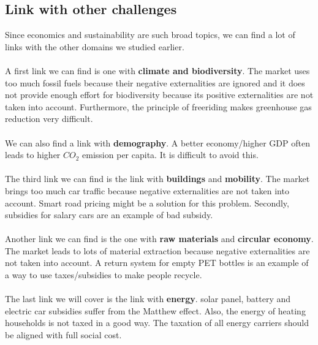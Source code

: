 \documentclass[../summary.tex]{subfiles}
\begin{document}
	\subsection{Link with other challenges}
	Since economics and sustainability are such broad topics, we can find a lot of links with the other domains we studied earlier. 
	\\\\
	A first link we can find is one with \textbf{climate and biodiversity}. The market uses too much fossil fuels because their negative externalities are ignored and it does not provide enough effort for biodiversity because its positive externalities are not taken into account. Furthermore, the principle of freeriding makes greenhouse gas reduction very difficult. 
	\\\\
	We can also find a link with \textbf{demography}. A better economy/higher GDP often leads to higher $CO_2$ emission per capita. It is difficult to avoid this. 
	\\\\
	The third link we can find is the link with \textbf{buildings} and \textbf{mobility}. The market brings too much car traffic because negative externalities are not taken into account. Smart road pricing might be a solution for this problem. Secondly, subsidies for salary cars are an example of bad subsidy. 
	\\\\
	Another link we can find is the one with \textbf{raw materials} and \textbf{circular economy}. The market leads to lots of material extraction because negative externalities are not taken into account. A return system for empty PET bottles is an example of a way to use taxes/subsidies to make people recycle.
	\\\\
	The last link we will cover is the link with \textbf{energy}. solar panel, battery and electric car subsidies suffer from the Matthew effect. Also, the energy of heating households is not taxed in a good way. The taxation of all energy carriers should be aligned with full social cost.
	
\end{document}
